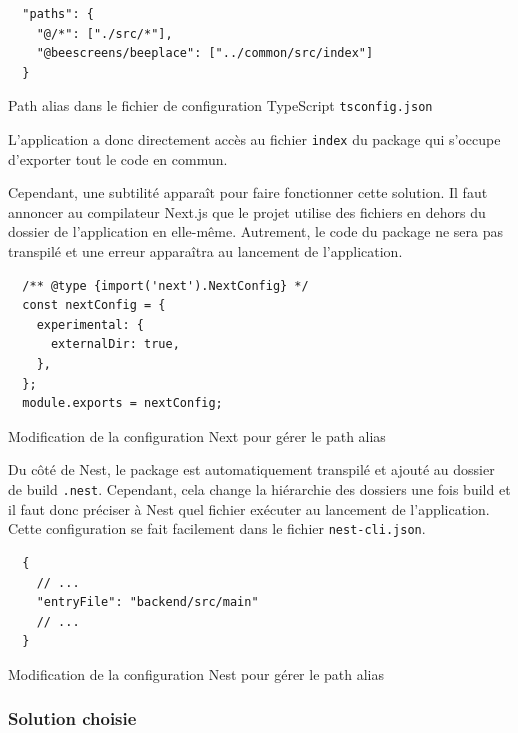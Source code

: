 \begin{listing}[H]
  \begin{verbatim}
  "paths": {
    "@/*": ["./src/*"],
    "@beescreens/beeplace": ["../common/src/index"]
  }
\end{verbatim}
  \caption{Path alias dans le fichier de configuration TypeScript \texttt{tsconfig.json}}
  \label{listing:path-alias-tsconfig}
\end{listing}

L'application a donc directement accès au fichier \texttt{index} du package qui s'occupe d'exporter tout le code en commun.

Cependant, une subtilité apparaît pour faire fonctionner cette solution. Il faut annoncer au compilateur Next.js que le projet utilise des fichiers en dehors du dossier de l'application en elle-même. Autrement, le code du package ne sera pas transpilé et une erreur apparaîtra au lancement de l'application.

\begin{listing}[H]
  \begin{verbatim}
  /** @type {import('next').NextConfig} */
  const nextConfig = {
    experimental: {
      externalDir: true,
    },
  };
  module.exports = nextConfig;
\end{verbatim}
  \caption{Modification de la configuration Next pour gérer le path alias}
  \label{listing:next-external-dir}
\end{listing}

Du côté de Nest, le package est automatiquement transpilé et ajouté au dossier de build \texttt{.nest}. Cependant, cela change la hiérarchie des dossiers une fois build et il faut donc préciser à Nest quel fichier exécuter au lancement de l'application. Cette configuration se fait facilement dans le fichier \texttt{nest-cli.json}.

\begin{listing}[H]
  \begin{verbatim}
  {
    // ...
    "entryFile": "backend/src/main"
    // ...
  }
\end{verbatim}
  \caption{Modification de la configuration Nest pour gérer le path alias}
  \label{listing:nest-entry-file}
\end{listing}

\subsubsection{Solution choisie}

